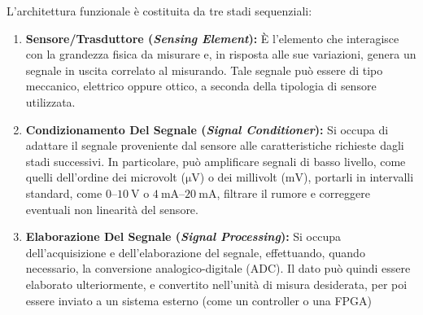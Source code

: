 ﻿\documentclass[11pt, a4paper]{article}
\begin{document}
\begin{center}
\end{center}

L'architettura funzionale è costituita da tre stadi sequenziali:

\begin{enumerate}
    \item \textbf{Sensore/Trasduttore (\textit{Sensing Element}):}
    È l'elemento che interagisce con la grandezza fisica da misurare e, in risposta alle sue variazioni, genera un segnale in uscita correlato al misurando. Tale segnale può essere di tipo meccanico, elettrico oppure ottico, a seconda della tipologia di sensore utilizzata.

    \item \textbf{Condizionamento Del Segnale (\textit{Signal Conditioner}):}
    Si occupa di adattare il segnale proveniente dal sensore alle caratteristiche richieste dagli stadi successivi. In particolare, può amplificare segnali di basso livello, come quelli dell'ordine dei microvolt ($\si{\micro\volt}$) o dei millivolt ($\si{\milli\volt}$), portarli in intervalli standard, come $0$--$\SI{10}{\volt}$ o $\SI{4}{\milli\ampere}$--$\SI{20}{\milli\ampere}$, filtrare il rumore e correggere eventuali non linearità del sensore.

    \item \textbf{Elaborazione Del Segnale (\textit{Signal Processing}):}
    Si occupa dell'acquisizione e dell'elaborazione del segnale, effettuando, quando necessario, la conversione analogico-digitale (ADC). Il dato può quindi essere elaborato ulteriormente, e convertito nell'unità di misura desiderata, per poi essere inviato a un sistema esterno (come un controller o una FPGA)
\end{enumerate}
\end{document}
